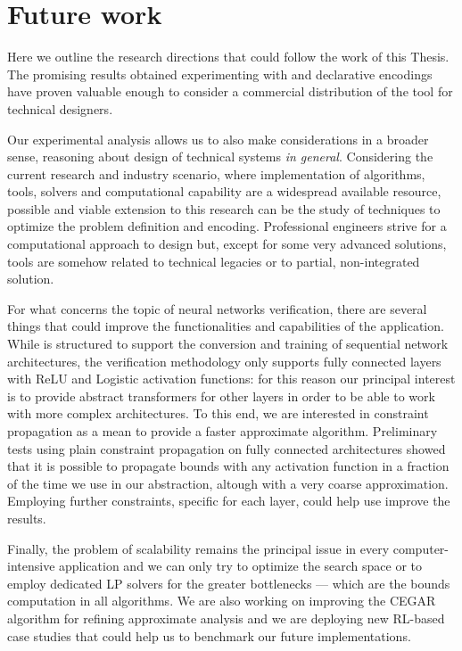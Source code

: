 \section{Future work}
\label{sec:future}
%
Here we outline the research directions that could follow the
work of this Thesis. The promising results obtained experimenting
with \liftcreate{} and declarative encodings have proven valuable
enough to consider a commercial distribution of the tool for
technical designers. 

Our experimental analysis allows us to also
make considerations in a broader sense, reasoning about design
of technical systems \textit{in general}. Considering the current
research and industry scenario, where implementation of algorithms, 
tools, solvers and computational capability are a widespread
available resource, possible and viable extension to this research 
can be the study of techniques to optimize the problem definition 
and encoding. Professional engineers strive for a computational 
approach to design but, except for some very advanced solutions, 
tools are somehow related to technical legacies or to partial, 
non-integrated solution.

For what concerns the topic of neural networks verification, 
there are several things that could improve the functionalities
and capabilities of the application. While \pynever{} is structured 
to support the conversion and training of sequential network 
architectures, the verification methodology only supports fully 
connected layers with ReLU and Logistic activation functions: 
for this reason our principal interest is to provide abstract 
transformers for other layers in order to be able to work with 
more complex architectures.
To this end, we are interested in constraint propagation as a
mean to provide a faster approximate algorithm. Preliminary
tests using plain constraint propagation on fully connected
architectures showed that it is possible to propagate bounds
with any activation function in a fraction of the time we use
in our abstraction, altough with a very coarse approximation. 
Employing further constraints, specific for each layer, could
help use improve the results.

Finally, the problem of scalability remains the principal issue
in every computer-intensive application and we can only try to
optimize the search space or to employ dedicated LP solvers for
the greater bottlenecks --- which are the bounds computation in
all algorithms. We are also working on improving the CEGAR
algorithm for refining approximate analysis and we are deploying
new RL-based case studies that could help us to benchmark our
future implementations.